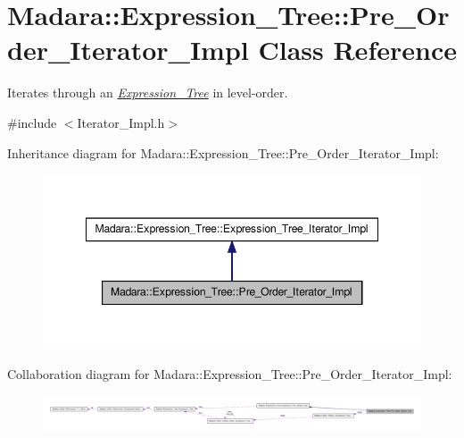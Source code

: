 \hypertarget{classMadara_1_1Expression__Tree_1_1Pre__Order__Iterator__Impl}{
\section{Madara::Expression\_\-Tree::Pre\_\-Order\_\-Iterator\_\-Impl Class Reference}
\label{d0/dfb/classMadara_1_1Expression__Tree_1_1Pre__Order__Iterator__Impl}
}


Iterates through an {\itshape \hyperlink{classMadara_1_1Expression__Tree_1_1Expression__Tree}{Expression\_\-Tree}\/} in level-\/order.  




{\ttfamily \#include $<$Iterator\_\-Impl.h$>$}



Inheritance diagram for Madara::Expression\_\-Tree::Pre\_\-Order\_\-Iterator\_\-Impl:
\nopagebreak
\begin{figure}[H]
\begin{center}
\leavevmode
\includegraphics[width=348pt]{dd/d89/classMadara_1_1Expression__Tree_1_1Pre__Order__Iterator__Impl__inherit__graph}
\end{center}
\end{figure}


Collaboration diagram for Madara::Expression\_\-Tree::Pre\_\-Order\_\-Iterator\_\-Impl:
\nopagebreak
\begin{figure}[H]
\begin{center}
\leavevmode
\includegraphics[width=400pt]{de/d49/classMadara_1_1Expression__Tree_1_1Pre__Order__Iterator__Impl__coll__graph}
\end{center}
\end{figure}
